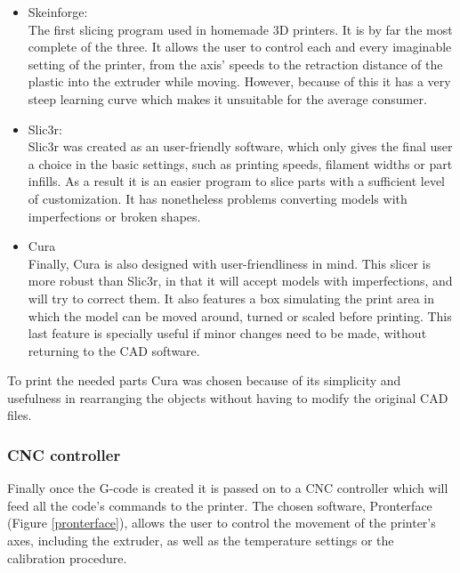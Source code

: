 			\begin{itemize}
			  
			  \item Skeinforge: \hfill \\
			  The first slicing program used in homemade 3D printers. It is by far the most complete of the three. It allows the user to control each and every imaginable setting of the printer, from the axis' speeds to the retraction distance of the plastic into the extruder while moving. However, because of this it has a very steep learning curve which makes it unsuitable for the average consumer.

			  \item Slic3r:  \hfill \\
			  Slic3r was created as an user-friendly software, which only gives the final user a choice in the basic settings, such as printing speeds, filament widths or part infills. As a result it is an easier program to slice parts with a sufficient level of customization. It has nonetheless problems converting models with imperfections or broken shapes.
			  
			  \item Cura \hfill \\
			  Finally, Cura is also designed with user-friendliness in mind. This slicer is more robust than Slic3r, in that it will accept models with imperfections, and will try to correct them. It also features a box simulating the print area in which the model can be moved around, turned or scaled before printing.
			  This last feature is specially useful if minor changes need to be made, without returning to the CAD software.
			
			\end{itemize}

		To print the needed parts Cura was chosen because of its simplicity and usefulness in rearranging the objects without having to modify the original CAD files.


		\subsubsection{CNC controller}
		Finally once the G-code is created it is passed on to a CNC controller which will feed all the code's commands to the printer. The chosen software, Pronterface (Figure \ref{pronterface}), allows the user to control the movement of the printer's axes, including the extruder, as well as the temperature settings or the calibration procedure.  


